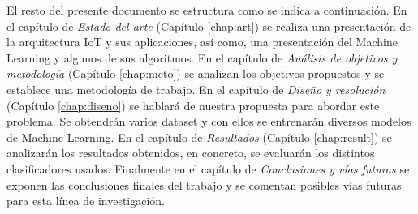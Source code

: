 El resto del presente documento se estructura como se indica a continuación. En el capítulo de \textit{Estado del arte} (Capítulo \ref{chap:art}) se realiza una presentación de la arquitectura IoT y sus aplicaciones, así como, una presentación del Machine Learning y algunos de sus algoritmos. En el capítulo de \textit{Análisis de objetivos y metodología} (Capítulo \ref{chap:meto}) se analizan los objetivos propuestos y se establece una metodología de trabajo. En el capítulo de \textit{Diseño y resolución} (Capítulo \ref{chap:diseno}) se hablará de nuestra propuesta para abordar este problema. Se obtendrán varios dataset y con ellos se entrenarán diversos modelos de Machine Learning. En el capítulo de \textit{Resultados} (Capítulo \ref{chap:result}) se analizarán los resultados obtenidos, en concreto, se evaluarán los distintos clasificadores usados. Finalmente en el capítulo de \textit{Conclusiones y vías futuras} se exponen las conclusiones finales del trabajo y se comentan posibles vías futuras para esta línea de investigación.

